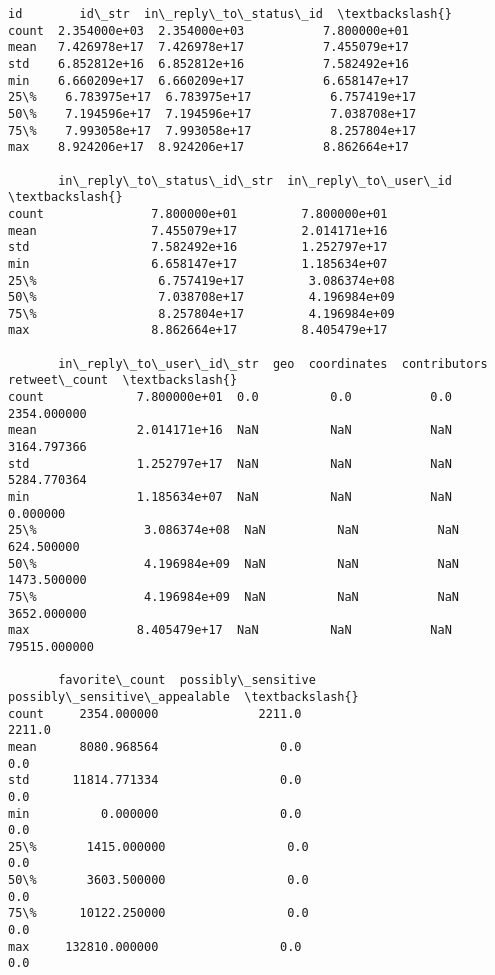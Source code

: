 \documentclass[11pt]{article}
\makeatletter
\newcommand{\boxspacing}{\kern\kvtcb@left@rule\kern\kvtcb@boxsep}
\newcommand{\prompt}[4]{
        {\ttfamily\llap{{\color{#2}[#3]:\hspace{3pt}#4}}\vspace{-\baselineskip}}
    }
\makeatother
\begin{document}
            \begin{tcolorbox}[breakable, size=fbox, boxrule=.5pt, pad at break*=1mm, opacityfill=0]
\prompt{Out}{outcolor}{32}{\boxspacing}
\begin{Verbatim}[commandchars=\\\{\}]
                 id        id\_str  in\_reply\_to\_status\_id  \textbackslash{}
count  2.354000e+03  2.354000e+03           7.800000e+01
mean   7.426978e+17  7.426978e+17           7.455079e+17
std    6.852812e+16  6.852812e+16           7.582492e+16
min    6.660209e+17  6.660209e+17           6.658147e+17
25\%    6.783975e+17  6.783975e+17           6.757419e+17
50\%    7.194596e+17  7.194596e+17           7.038708e+17
75\%    7.993058e+17  7.993058e+17           8.257804e+17
max    8.924206e+17  8.924206e+17           8.862664e+17

       in\_reply\_to\_status\_id\_str  in\_reply\_to\_user\_id  \textbackslash{}
count               7.800000e+01         7.800000e+01
mean                7.455079e+17         2.014171e+16
std                 7.582492e+16         1.252797e+17
min                 6.658147e+17         1.185634e+07
25\%                 6.757419e+17         3.086374e+08
50\%                 7.038708e+17         4.196984e+09
75\%                 8.257804e+17         4.196984e+09
max                 8.862664e+17         8.405479e+17

       in\_reply\_to\_user\_id\_str  geo  coordinates  contributors  retweet\_count  \textbackslash{}
count             7.800000e+01  0.0          0.0           0.0    2354.000000
mean              2.014171e+16  NaN          NaN           NaN    3164.797366
std               1.252797e+17  NaN          NaN           NaN    5284.770364
min               1.185634e+07  NaN          NaN           NaN       0.000000
25\%               3.086374e+08  NaN          NaN           NaN     624.500000
50\%               4.196984e+09  NaN          NaN           NaN    1473.500000
75\%               4.196984e+09  NaN          NaN           NaN    3652.000000
max               8.405479e+17  NaN          NaN           NaN   79515.000000

       favorite\_count  possibly\_sensitive  possibly\_sensitive\_appealable  \textbackslash{}
count     2354.000000              2211.0                         2211.0
mean      8080.968564                 0.0                            0.0
std      11814.771334                 0.0                            0.0
min          0.000000                 0.0                            0.0
25\%       1415.000000                 0.0                            0.0
50\%       3603.500000                 0.0                            0.0
75\%      10122.250000                 0.0                            0.0
max     132810.000000                 0.0                            0.0


\end{Verbatim}
\end{tcolorbox}
\end{document}
